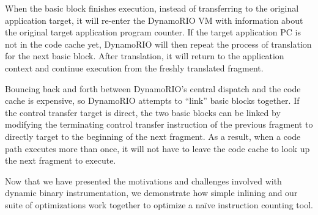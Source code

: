 When the basic block finishes execution, instead of transferring to the original
application target, it will re-enter the DynamoRIO VM with information about the
original target application program counter.  If the target application PC is
not in the code cache yet, DynamoRIO will then repeat the process of translation
for the next basic block.  After translation, it will return to the application
context and continue execution from the freshly translated fragment.

Bouncing back and forth between DynamoRIO's central dispatch and the code cache
is expensive, so DynamoRIO attempts to ``link'' basic blocks together.  If the
control transfer target is direct, the two basic blocks can be linked by
modifying the terminating control transfer instruction of the previous fragment
to directly target to the beginning of the next fragment.  As a result, when a
code path executes more than once, it will not have to leave the code cache to
look up the next fragment to execute.

Now that we have presented the motivations and challenges involved with dynamic
binary instrumentation, we demonstrate how simple inlining and our suite of
optimizations work together to optimize a na\"ive instruction counting tool.
